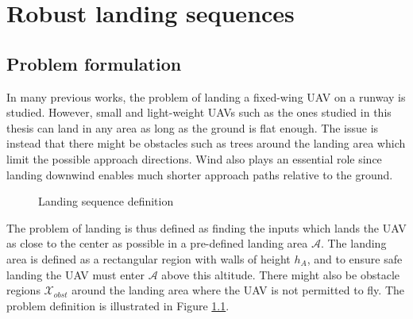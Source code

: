 \chapter{Robust landing sequences}\label{cha:landing}
\section{Problem formulation}
In many previous works, the problem of landing a fixed-wing UAV on a runway is studied. However, small and light-weight UAVs such as the ones studied 
in this thesis can land in any area as long as the ground is flat enough. The issue is instead that there might be obstacles such as trees around the landing area which limit the possible 
approach directions. Wind also plays an essential role since landing downwind enables much shorter approach paths relative to the ground.

\begin{figure}
    \begin{center}
    \end{center}
    \caption{Landing sequence definition}
    \label{fig:land}          
\end{figure}

The problem of landing is thus defined as finding the inputs which lands the UAV as close to the center as possible in a pre-defined landing area $\mathcal{A}$. The landing area is 
defined as a rectangular region with walls of height $h_A$, and to ensure safe landing the UAV must enter $\mathcal{A}$ above this altitude. 
There might also be obstacle regions $\mathcal{X}_{obst}$ around the landing area where the UAV is not permitted to fly. The problem definition is illustrated in Figure \ref{fig:land}.

